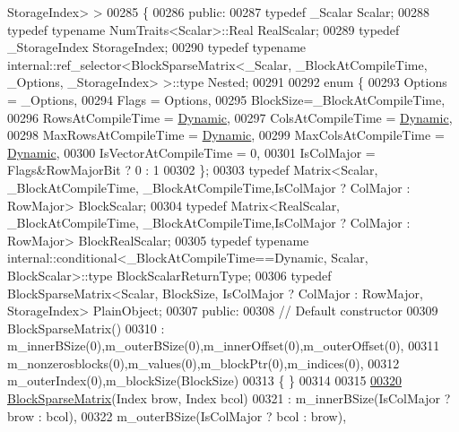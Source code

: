 \begin{DoxyCode}
      StorageIndex> >
00285 \{
00286   \textcolor{keyword}{public}:
00287     \textcolor{keyword}{typedef} \_Scalar Scalar;
00288     \textcolor{keyword}{typedef} \textcolor{keyword}{typename} NumTraits<Scalar>::Real RealScalar;
00289     \textcolor{keyword}{typedef} \_StorageIndex StorageIndex;
00290     \textcolor{keyword}{typedef} \textcolor{keyword}{typename} internal::ref\_selector<BlockSparseMatrix<\_Scalar, \_BlockAtCompileTime, \_Options,
       \_StorageIndex> >::type Nested;
00291 
00292     \textcolor{keyword}{enum} \{
00293       Options = \_Options,
00294       Flags = Options,
00295       BlockSize=\_BlockAtCompileTime,
00296       RowsAtCompileTime = \hyperlink{namespace_eigen_ad81fa7195215a0ce30017dfac309f0b2}{Dynamic},
00297       ColsAtCompileTime = \hyperlink{namespace_eigen_ad81fa7195215a0ce30017dfac309f0b2}{Dynamic},
00298       MaxRowsAtCompileTime = \hyperlink{namespace_eigen_ad81fa7195215a0ce30017dfac309f0b2}{Dynamic},
00299       MaxColsAtCompileTime = \hyperlink{namespace_eigen_ad81fa7195215a0ce30017dfac309f0b2}{Dynamic},
00300       IsVectorAtCompileTime = 0,
00301       IsColMajor = Flags&RowMajorBit ? 0 : 1
00302     \};
00303     \textcolor{keyword}{typedef} Matrix<Scalar, \_BlockAtCompileTime, \_BlockAtCompileTime,IsColMajor ? ColMajor : RowMajor> 
      BlockScalar;
00304     \textcolor{keyword}{typedef} Matrix<RealScalar, \_BlockAtCompileTime, \_BlockAtCompileTime,IsColMajor ? ColMajor : RowMajor> 
      BlockRealScalar;
00305     \textcolor{keyword}{typedef} \textcolor{keyword}{typename} internal::conditional<\_BlockAtCompileTime==Dynamic, Scalar, BlockScalar>::type 
      BlockScalarReturnType;
00306     \textcolor{keyword}{typedef} BlockSparseMatrix<Scalar, BlockSize, IsColMajor ? ColMajor : RowMajor, StorageIndex> 
      PlainObject;
00307   \textcolor{keyword}{public}:
00308     \textcolor{comment}{// Default constructor}
00309     BlockSparseMatrix()
00310     : m\_innerBSize(0),m\_outerBSize(0),m\_innerOffset(0),m\_outerOffset(0),
00311       m\_nonzerosblocks(0),m\_values(0),m\_blockPtr(0),m\_indices(0),
00312       m\_outerIndex(0),m\_blockSize(BlockSize)
00313     \{ \}
00314 
00315 
\hyperlink{group___sparse_core___module_a319d4ed434693fc09cdb7d71e090bbd8}{00320}     \hyperlink{group___sparse_core___module_a319d4ed434693fc09cdb7d71e090bbd8}{BlockSparseMatrix}(Index brow, Index bcol)
00321       : m\_innerBSize(IsColMajor ? brow : bcol),
00322         m\_outerBSize(IsColMajor ? bcol : brow),

\end{DoxyCode}
